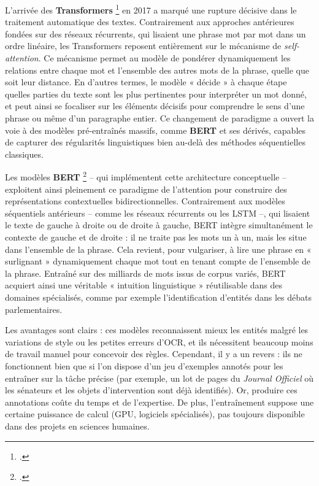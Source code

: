 L’arrivée des \textbf{Transformers} \footcite[][]{vaswani} en 2017 a marqué une rupture décisive dans le traitement automatique des textes. Contrairement aux approches antérieures fondées sur des réseaux récurrents, qui lisaient une phrase mot par mot dans un ordre linéaire, les Transformers reposent entièrement sur le mécanisme de \emph{self-attention}. Ce mécanisme permet au modèle de pondérer dynamiquement les relations entre chaque mot et l’ensemble des autres mots de la phrase, quelle que soit leur distance. En d’autres termes, le modèle « décide » à chaque étape quelles parties du texte sont les plus pertinentes pour interpréter un mot donné, et peut ainsi se focaliser sur les éléments décisifs pour comprendre le sens d’une phrase ou même d’un paragraphe entier. Ce changement de paradigme a ouvert la voie à des modèles pré-entraînés massifs, comme \textbf{BERT} et ses dérivés, capables de capturer des régularités linguistiques bien au-delà des méthodes séquentielles classiques.

Les modèles \textbf{BERT} \footcite[][]{devlin} -- qui implémentent cette architecture conceptuelle -- exploitent ainsi pleinement ce paradigme de l'attention pour construire des représentations contextuelles bidirectionnelles. Contrairement aux modèles séquentiels antérieurs -- comme les réseaux récurrents ou les LSTM --, qui lisaient le texte de gauche à droite ou de droite à gauche, BERT intègre simultanément le contexte de gauche et de droite : il ne traite pas les mots un à un, mais les situe dans l’ensemble de la phrase. Cela revient, pour vulgariser, à lire une phrase en « surlignant » dynamiquement chaque mot tout en tenant compte de l’ensemble de la phrase. Entraîné sur des milliards de mots issus de corpus variés, BERT acquiert ainsi une véritable « intuition linguistique » réutilisable dans des domaines spécialisés, comme par exemple l’identification d’entités dans les débats parlementaires.

Les avantages sont clairs : ces modèles reconnaissent mieux les entités malgré les variations de style ou les petites erreurs d’OCR, et ils nécessitent beaucoup moins de travail manuel pour concevoir des règles. Cependant, il y a un revers : ils ne fonctionnent bien que si l’on dispose d’un jeu d’exemples annotés pour les entraîner sur la tâche précise (par exemple, un lot de pages du \emph{Journal Officiel} où les sénateurs et les objets d’intervention sont déjà identifiés). Or, produire ces annotations coûte du temps et de l’expertise. De plus, l’entraînement suppose une certaine puissance de calcul (GPU, logiciels spécialisés), pas toujours disponible dans des projets en sciences humaines.

